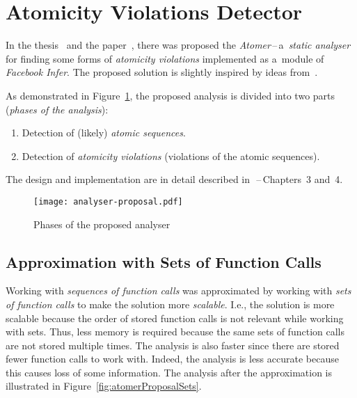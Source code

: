 
\section{Atomicity Violations Detector}
\label{sec:atomer}

In the thesis~\cite{harmimBP} and the paper~\cite{excel2019FBInfer}, there
was proposed the \emph{Atomer}\,--\,a~\emph{static analyser} for finding some
forms of \emph{atomicity violations} implemented as a~module of \emph{Facebook
Infer}. The proposed solution is slightly inspired by ideas from~\cite{contract,
contracts2017, contracts2015, muzikovskaBP, excel2018Muzikovska}.

As demonstrated in Figure~\ref{fig:atomerProposal}, the proposed analysis is
divided into two parts (\emph{phases of the analysis}):
\begin{enumerate}[label={\textbf{Phase~\arabic*}:}, leftmargin=5em]
    \item
        Detection of (likely) \emph{atomic sequences}.

    \item
        Detection of \emph{atomicity violations} (violations of the atomic
        sequences).
\end{enumerate}
The design and implementation are in detail described
in~\cite{harmimBP}\,--\,Chapters~3 and~4.

\begin{figure}[hbt]
    \centering
    \texttt{[image: analyser-proposal.pdf]}
    \caption{Phases of the proposed analyser}
    \label{fig:atomerProposal}
\end{figure}

\subsection{\sloppy%
    Approximation with Sets of Function Calls%
}

Working with \emph{sequences of function calls} was approximated by working
with \emph{sets of function calls} to make the solution more \emph{scalable}.
I.e., the solution is more scalable because the order of stored function calls
is not relevant while working with sets. Thus, less memory is required
because the same sets of function calls are not stored multiple times. The
analysis is also faster since there are stored fewer function calls to work
with. Indeed, the analysis is less accurate because this causes loss of
some information. The analysis after the approximation is illustrated in
Figure~\ref{fig:atomerProposalSets}.

